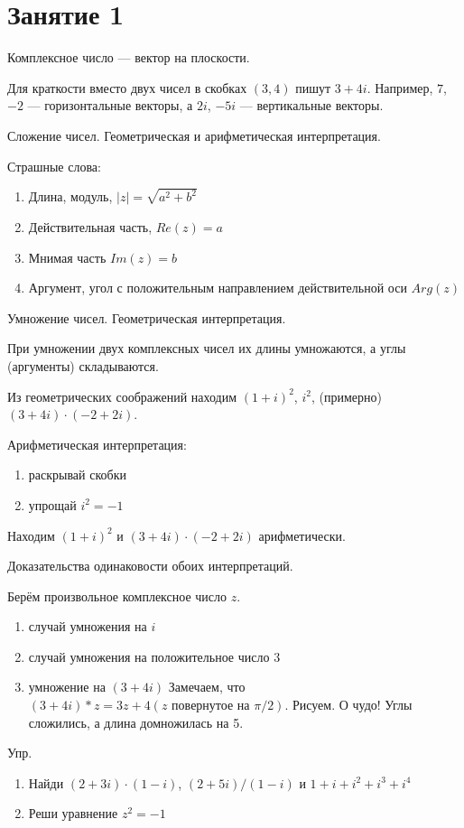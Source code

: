 \documentclass[12pt,a4paper]{article}
\begin{document}
\section{Занятие 1}



Комплексное число --- вектор  на плоскости. 


Для краткости вместо двух чисел в скобках $(3, 4)$ пишут $3+4i$. Например, $7$, $-2$ --- горизонтальные векторы, а $2i$, $-5i$ --- вертикальные векторы.


Сложение чисел. Геометрическая и арифметическая интерпретация.


Страшные слова:
\begin{enumerate}
\item Длина, модуль, $|z|=\sqrt{a^2+b^2}$
\item Действительная часть, $Re(z)=a$
\item Мнимая часть $Im(z)=b$
\item Аргумент, угол с положительным направлением действительной оси $Arg(z)$
\end{enumerate}


Умножение чисел. Геометрическая интерпретация.

При умножении двух комплексных чисел их длины умножаются, а углы (аргументы) складываются.


Из геометрических соображений находим $(1+i)^2$, $i^2$, (примерно) $(3+4i)\cdot (-2+2i)$.

Арифметическая интерпретация:
\begin{enumerate}
\item раскрывай скобки
\item упрощай $i^2=-1$
\end{enumerate}

Находим $(1+i)^2$ и $(3+4i)\cdot (-2+2i)$ арифметически.

Доказательства одинаковости обоих интерпретаций.

Берём произвольное комплексное число $z$.
\begin{enumerate}
\item  случай умножения на $i$
\item  случай умножения на положительное число $3$
\item умножение на $(3+4i)$
Замечаем, что $(3+4i)*z = 3z + 4(z \text{ повернутое на } \pi/2)$.
Рисуем. О чудо! Углы сложились, а длина домножилась на 5.
\end{enumerate}


Упр. 
\begin{enumerate}
\item Найди $(2+3i)\cdot (1-i)$, $(2+5i)/(1-i)$ и $1+i+i^2+i^3+i^4$
\item Реши уравнение $z^2=-1$
\end{enumerate}
\end{document}
